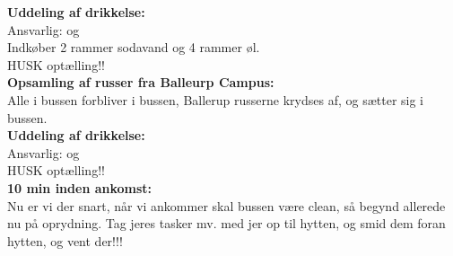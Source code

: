 \textbf{Uddeling af drikkelse:} \\
Ansvarlig: \Ora og \Johnny \\
Indkøber 2 rammer sodavand og 4 rammer øl. \\
HUSK optælling!! \\

\textbf{Opsamling af russer fra Balleurp Campus: }\\
Alle i bussen forbliver i bussen, Ballerup russerne krydses af, og sætter sig i bussen. \\

\textbf{Uddeling af drikkelse:}\\
Ansvarlig: \Ora og \Johnny \\
HUSK optælling!! \\

\textbf{10 min inden ankomst:}\\
Nu er vi der snart, når vi ankommer skal bussen være clean, så begynd allerede nu på oprydning. 
Tag jeres tasker mv. med jer op til hytten, og smid dem foran hytten, og vent der!!!

